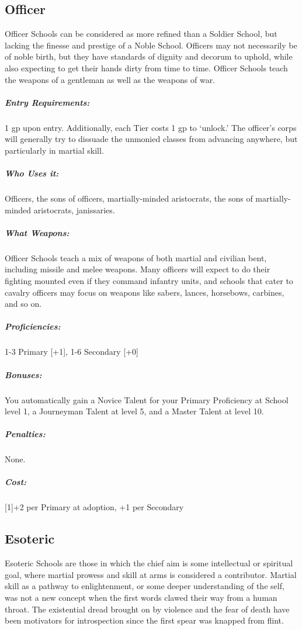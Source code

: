 \documentclass[oneside,11pt,english]{book}
\begin{document}
\subsection{Officer}
Officer Schools can be considered as more refined than a Soldier School, but lacking the finesse and 
prestige of a Noble School. Officers may not necessarily be of noble birth, but they have standards of 
dignity and decorum to uphold, while also expecting to get their hands dirty from time to time. Officer 
Schools teach the weapons of a gentleman as well as the weapons of war. 

\subparagraph{Entry Requirements:} 1 gp upon entry. Additionally, each Tier costs 1 gp to ‘unlock.’ The officer’s corps will generally try to dissuade the unmonied classes from advancing anywhere, but particularly in martial skill. 
\subparagraph{Who Uses it:} Officers, the sons of officers, martially-minded aristocrats, the sons of martially-minded aristocrats, janissaries. 
\subparagraph{What Weapons:} Officer Schools teach a mix of weapons of both martial and civilian bent, including missile and melee weapons. Many officers will expect to do their fighting mounted even if they command 
infantry units, and schools that cater to cavalry officers may focus on weapons like sabers, lances, 
horsebows, carbines, and so on. 
\subparagraph{Proficiencies:} 1-3 Primary [+1], 1-6 Secondary [+0] 
\subparagraph{Bonuses:} You automatically gain a Novice Talent for your Primary Proficiency at School level 1, a 
Journeyman Talent at level 5, and a Master Talent at level 10. 
\subparagraph{Penalties:} None.
\subparagraph{Cost:} [1]+2 per Primary at adoption, +1 per Secondary 

\subsection{Esoteric}
Esoteric Schools are those in which the chief aim is some intellectual or spiritual goal, where martial 
prowess and skill at arms is considered a contributor. Martial skill as a pathway to enlightenment, or some 
deeper understanding of the self, was not a new concept when the first words clawed their way from a 
human throat. The existential dread brought on by violence and the fear of death have been motivators for 
introspection since the first spear was knapped from flint. 
\end{document}
